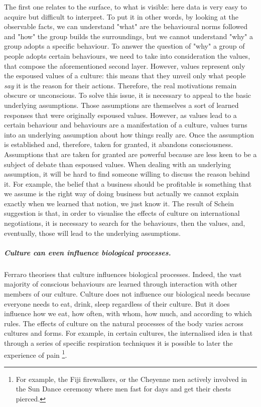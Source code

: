 \documentclass[../main.tex]{subfiles}
\begin{document}
The first one relates to the surface, to what is visible: here data is very easy to acquire but difficult to interpret. To put it in other words, by looking at the observable facts, we can understand "what" are the behavioural norms followed and "how" the group builds the surroundings, but we cannot understand "why" a group adopts a specific behaviour. To answer the question of "why" a group of people adopts certain behaviours, we need to take into consideration the values, that compose the aforementioned second layer. However, values represent only the espoused values of a culture: this means that they unveil only what people \textit{say} it is the reason for their actions. Therefore, the real motivations remain obscure or unconscious. To solve this issue, it is necessary to appeal to the basic underlying assumptions. Those assumptions are themselves a sort of learned responses that were originally espoused values. However, as values lead to a certain behaviour and behaviours are a manifestation of a culture, values turns into an underlying assumption about how things really are. Once the assumption is established and, therefore, taken for granted, it abandons consciousness. Assumptions that are taken for granted are powerful because are less keen to be a subject of debate than espoused values. When dealing with an underlying assumption, it will be hard to find someone willing to discuss the reason behind it. For example, the belief that a business should be profitable is something that we assume is the right way of doing business but actually we cannot explain exactly when we learned that notion, we just know it. The result of Schein suggestion is that, in order to visualise the effects of culture on international negotiations, it is necessary to search for the behaviours, then the values, and, eventually, those will lead to the underlying assumptions.%

\subparagraph*{Culture can even influence biological processes.} Ferraro theorises that culture influences biological processes. Indeed, the vast majority of conscious behaviours are learned through interaction with other members of our culture. Culture does not influence our biological needs because everyone needs to eat, drink, sleep regardless of their culture. But it does influence how we eat, how often, with whom, how much, and according to which rules. The effects of culture on the natural processes of the body varies across cultures and forms. For example, in certain cultures, the internalised idea is that through a series of specific respiration techniques it is possible to later the experience of pain \footnote{For example, the Fiji firewalkers, or the Cheyenne men actively involved in the Sun Dance ceremony where men fast for days and get their chests pierced.}.
\end{document}
